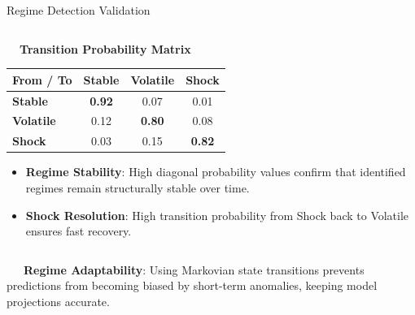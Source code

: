 \documentclass{beamer}
\begin{document}
\begin{frame}{Regime Detection Validation}
\begin{columns}[T]
    \begin{column}{0.48\textwidth}
        \begin{smallcard}[0.98\textwidth, top=3pt, bottom=3pt, left=4pt, right=4pt, boxsep=0.5pt]
            \centering \textbf{\textcolor{primaryDark}{\small {}~~Transition Probability Matrix}}
            \vspace{0.08cm}
            \fontsize{6.8pt}{8.2pt}\selectfont
            \begin{table}
            \centering
            \begin{tabular}{l c c c}
                \toprule
                \textbf{From / To} & \textbf{Stable} & \textbf{Volatile} & \textbf{Shock} \\
                \midrule
                \textbf{Stable} & \textbf{0.92} & 0.07 & 0.01 \\
                \textbf{Volatile} & 0.12 & \textbf{0.80} & 0.08 \\
                \textbf{Shock} & 0.03 & 0.15 & \textbf{0.82} \\
                \bottomrule
            \end{tabular}
            \end{table}
            \vspace{0.1cm}
            \begin{itemize}\setlength\itemsep{2pt}\setlength\parskip{0pt}
                \item \textbf{Regime Stability}: High diagonal probability values confirm that identified regimes remain structurally stable over time.
                \item \textbf{Shock Resolution}: High transition probability from Shock back to Volatile ensures fast recovery.
            \end{itemize}
        \end{smallcard}
    \end{column}
\end{columns}

\vspace{0.15cm}
\begin{tcolorbox}[enhanced, colback=primaryblue!4, colframe=primaryblue!30, boxrule=0.35pt,
  arc=3.5pt, width=0.98\textwidth, left=4pt, right=4pt, top=2.5pt, bottom=2.5pt, boxsep=0pt,
  halign=center, shadow={0.5pt}{-0.5pt}{0pt}{black!8}]
    \fontsize{5.5pt}{6.5pt}\selectfont
    \textcolor{primaryDark}{~~~\textbf{Regime Adaptability}: Using Markovian state transitions prevents predictions from becoming biased by short-term anomalies, keeping model projections accurate.}
\end{tcolorbox}
\end{frame}
\end{document}
